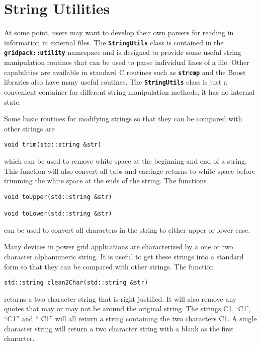 \section{String Utilities}

At some point, users may want to develop their own parsers for reading in information in external files. The \texttt{\textbf{StringUtils}} class is contained in the \texttt{\textbf{gridpack::utility}} namespace and is designed to provide some useful string manipulation routines that can be used to parse individual lines of a file. Other capabilities are available in standard C routines such as \texttt{\textbf{strcmp}} and the Boost libraries also have many useful routines. The \texttt{\textbf{StringUtils}} class is just a convenient container for different string manipulation methods; it has no internal state.

Some basic routines for modifying strings so that they can be compared with other strings are

{
\color{red}
\begin{Verbatim}[fontseries=b]
void trim(std::string &str)
\end{Verbatim}
}

which can be used to remove white space at the beginning and end of a string. This function will also convert all tabs and carriage returns to white space before trimming the white space at the ends of the string. The functions

{
\color{red}
\begin{Verbatim}[fontseries=b]
void toUpper(std::string &str)

void toLower(std::string &str)
\end{Verbatim}
}

can be used to convert all characters in the string to either upper or lower case.

Many devices in power grid applications are characterized by a one or two character alphanumeric string. It is useful to get these strings into a standard form so that they can be compared with other strings. The function

{
\color{red}
\begin{Verbatim}[fontseries=b]
std::string clean2Char(std::string &str)
\end{Verbatim}
}

returns a two character string that is right justified. It will also remove any quotes that may or may not be around the original string. The strings C1, `C1', ``C1'' and ``  C1'' will all return a string containing the two characters C1. A single character string will return a two character string with a blank as the first character.

